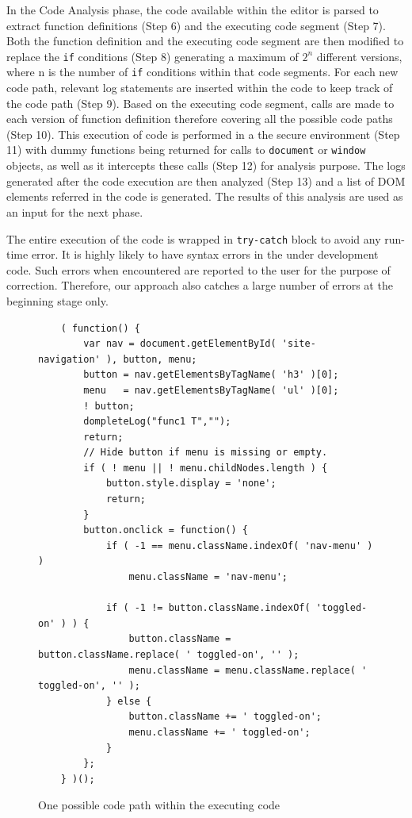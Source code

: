 		In the Code Analysis phase, the \javascript code available within the editor is parsed to extract function definitions (Step 6) and the executing code segment (Step 7). Both the function definition and the executing code segment are then modified to replace the \texttt{if} conditions (Step 8) generating a maximum of $2^n$ different versions, where n is the number of \texttt{if} conditions within that code segments. For each new code path, relevant log statements are inserted within the code to keep track of the code path (Step 9). Based on the executing code segment, calls are made to each version of function definition therefore covering all the possible code paths (Step 10). This execution of \javascript code is performed in a the secure environment (Step 11) with dummy functions being returned for calls to \texttt{document} or \texttt{window} objects, as well as it intercepts these calls (Step 12) for analysis purpose. The logs generated after the code execution are then analyzed (Step 13) and a list of DOM elements referred in the code is generated. The results of this analysis are used as an input for the next phase.
		
		The entire execution of the code is wrapped in \texttt{try-catch} block to avoid any run-time error. It is highly likely to have syntax errors in the under development code. Such errors when encountered are reported to the user for the purpose of correction. Therefore, our approach also catches a large number of errors at the beginning stage only.
		
		
		\begin{figure}
			\medskip
			\begin{lstlisting}
	( function() {
		var nav = document.getElementById( 'site-navigation' ), button, menu;
		button = nav.getElementsByTagName( 'h3' )[0];
		menu   = nav.getElementsByTagName( 'ul' )[0];
		! button;
		dompleteLog("func1 T","");
		return;
		// Hide button if menu is missing or empty.
		if ( ! menu || ! menu.childNodes.length ) {
			button.style.display = 'none';
			return;
		}
		button.onclick = function() {
			if ( -1 == menu.className.indexOf( 'nav-menu' ) )
				menu.className = 'nav-menu';

			if ( -1 != button.className.indexOf( 'toggled-on' ) ) {	
				button.className = button.className.replace( ' toggled-on', '' );
				menu.className = menu.className.replace( ' toggled-on', '' );
			} else {
				button.className += ' toggled-on';
				menu.className += ' toggled-on';
			}
		};
	} )();
			\end{lstlisting}
			\caption{One possible code path within the executing code}
			\label{Fig:Path}
			\end{figure}
			
